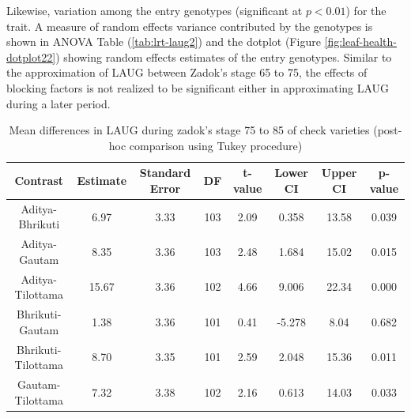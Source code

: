 \documentclass[12pt,oneside]{dukestatscithesis} %
\theoremstyle{definition}
\theoremstyle{definition}
\theoremstyle{definition}
\theoremstyle{remark}
\begin{document}
Likewise, variation among the entry genotypes (significant at
\(p < 0.01\)) for the trait. A measure of random effects variance
contributed by the genotypes is shown in ANOVA Table
(\ref{tab:lrt-laug2}) and the dotplot (Figure
\ref{fig:leaf-health-dotplot22}) showing random effects estimates of the
entry genotypes. Similar to the approximation of LAUG between Zadok's
stage 65 to 75, the effects of blocking factors is not realized to be
significant either in approximating LAUG during a later period.
\begin{table}[H]

\caption{\label{tab:leaf-health-meanconf-tab6}Mean differences in LAUG during zadok's stage 75 to 85 of check varieties (post-hoc comparison using Tukey procedure)}
\centering
\begin{tabular}[t]{cccccccc}
\toprule
Contrast & Estimate & Standard Error & DF & t-value & Lower CI & Upper CI & p-value\\
\midrule
Aditya-Bhrikuti & 6.97 & 3.33 & 103 & 2.09 & 0.358 & 13.58 & 0.039\\
Aditya-Gautam & 8.35 & 3.36 & 103 & 2.48 & 1.684 & 15.02 & 0.015\\
Aditya-Tilottama & 15.67 & 3.36 & 102 & 4.66 & 9.006 & 22.34 & 0.000\\
Bhrikuti-Gautam & 1.38 & 3.36 & 101 & 0.41 & -5.278 & 8.04 & 0.682\\
Bhrikuti-Tilottama & 8.70 & 3.35 & 101 & 2.59 & 2.048 & 15.36 & 0.011\\
Gautam-Tilottama & 7.32 & 3.38 & 102 & 2.16 & 0.613 & 14.03 & 0.033\\
\bottomrule
\end{tabular}
\end{table}
\end{document}
